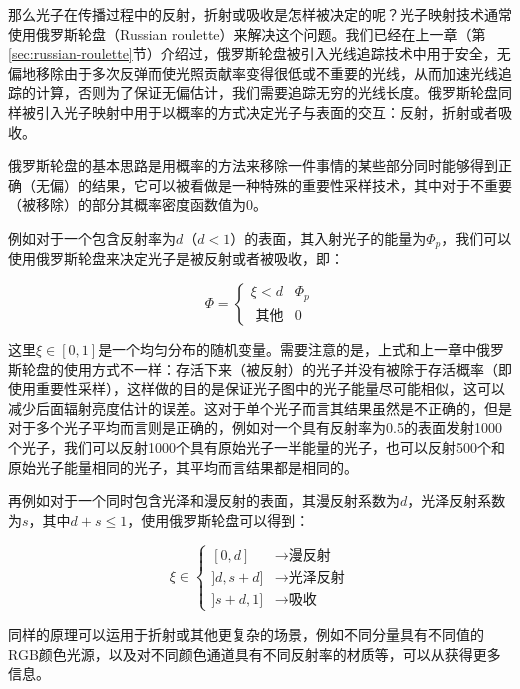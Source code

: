 那么光子在传播过程中的反射，折射或吸收是怎样被决定的呢？光子映射技术通常使用俄罗斯轮盘（Russian roulette）来解决这个问题。我们已经在上一章（第\ref{sec:russian-roulette}节）介绍过，俄罗斯轮盘被引入光线追踪技术中用于安全，无偏地移除由于多次反弹而使光照贡献率变得很低或不重要的光线，从而加速光线追踪的计算，否则为了保证无偏估计，我们需要追踪无穷的光线长度。俄罗斯轮盘同样被引入光子映射中用于以概率的方式决定光子与表面的交互：反射，折射或者吸收。

俄罗斯轮盘的基本思路是用概率的方法来移除一件事情的某些部分同时能够得到正确（无偏）的结果，它可以被看做是一种特殊的重要性采样技术，其中对于不重要（被移除）的部分其概率密度函数值为0。

例如对于一个包含反射率为$d$（$d<1$）的表面，其入射光子的能量为$\Phi_p$，我们可以使用俄罗斯轮盘来决定光子是被反射或者被吸收，即：

\begin{equation}
	\Phi=\begin{cases}
		\xi<d  & \Phi_p\\
		\text{ 其他}  & 0
	\end{cases}
\end{equation}

\noindent 这里$\xi\in[0,1]$是一个均匀分布的随机变量。需要注意的是，上式和上一章中俄罗斯轮盘的使用方式不一样：存活下来（被反射）的光子并没有被除于存活概率（即使用重要性采样），这样做的目的是保证光子图中的光子能量尽可能相似，这可以减少后面辐射亮度估计的误差。这对于单个光子而言其结果虽然是不正确的，但是对于多个光子平均而言则是正确的，例如对一个具有反射率为0.5的表面发射1000个光子，我们可以反射1000个具有原始光子一半能量的光子，也可以反射500个和原始光子能量相同的光子，其平均而言结果都是相同的。

再例如对于一个同时包含光泽和漫反射的表面，其漫反射系数为$d$，光泽反射系数为$s$，其中$d+s\leq 1$，使用俄罗斯轮盘可以得到：

\begin{equation}
	\xi\in\begin{cases}
		[0,d]  & \longrightarrow\text{漫反射}\\
		]d,s+d]& \longrightarrow\text{光泽反射}\\
		]s+d,1]& \longrightarrow\text{吸收}
	\end{cases}
\end{equation}

同样的原理可以运用于折射或其他更复杂的场景，例如不同分量具有不同值的RGB颜色光源，以及对不同颜色通道具有不同反射率的材质等，可以从\cite{a:APracticalGuidetoGlobalIlluminationusingPhotonMaps}获得更多信息。

